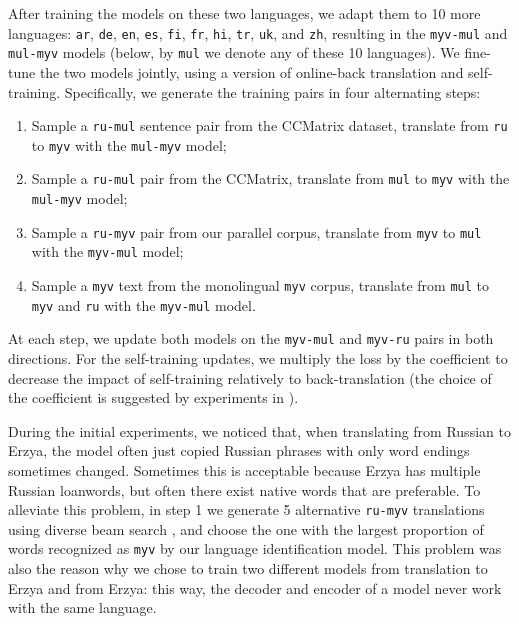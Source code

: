 \documentclass[11pt]{article}
\begin{document}
After training the models on these two languages, we adapt them to 10 more languages: \texttt{ar}, \texttt{de}, \texttt{en}, \texttt{es}, \texttt{fi}, \texttt{fr}, \texttt{hi}, \texttt{tr}, \texttt{uk}, and \texttt{zh}, resulting in the \texttt{myv-mul} and \texttt{mul-myv} models (below, by \texttt{mul} we denote any of these 10 languages). We fine-tune the two models jointly, using a version of online-back translation and self-training. Specifically, we generate the training pairs in four alternating steps:
\begin{enumerate}
    \item Sample a \texttt{ru-mul} sentence pair from the CCMatrix \cite{schwenk-etal-2021-ccmatrix} dataset, translate from \texttt{ru} to \texttt{myv} with the \texttt{mul-myv} model;
    \item Sample a \texttt{ru-mul} pair from the CCMatrix, translate from \texttt{mul} to \texttt{myv} with the \texttt{mul-myv} model;
    \item Sample a \texttt{ru-myv} pair from our parallel corpus, translate from \texttt{myv} to \texttt{mul} with the \texttt{myv-mul} model;
    \item Sample a \texttt{myv} text from the monolingual \texttt{myv} corpus, translate from \texttt{mul} to \texttt{myv} and \texttt{ru} with the \texttt{myv-mul} model.
\end{enumerate}
At each step, we update both models on the \texttt{myv-mul} and \texttt{myv-ru} pairs in both directions. For the self-training updates, we multiply the loss by the coefficient  to decrease the impact of self-training relatively to back-translation (the choice of the coefficient is suggested by experiments in \citet{he-etal-2022-bridging}).

During the initial experiments, we noticed that, when translating from Russian to Erzya, the model often just copied Russian phrases with only word endings sometimes changed. Sometimes this is acceptable because Erzya has multiple Russian loanwords, but often there exist native words that are preferable. To alleviate this problem, in step 1 we generate 5 alternative \texttt{ru-myv} translations using diverse beam search \cite{vijayakumar2016diverse}, and choose the one with the largest proportion of words recognized as \texttt{myv} by our language identification model. This problem was also the reason why we chose to train two different models from translation to Erzya and from Erzya: this way, the decoder and encoder of a model never work with the same language.
\end{document}
